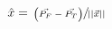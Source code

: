 \begin{equation}
 \begin{aligned}
 \hat{x}=\sfrac{\left(\vec{P_F}-\vec{P_T}\right)}{||\vec{x}||}\label{eqn:calcmom001} 
\end{aligned}
\end{equation}
